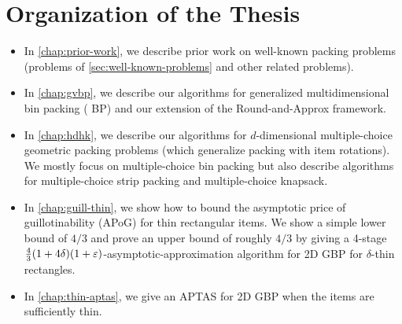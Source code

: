 \section{Organization of the Thesis}

\begin{itemize}
\item In \cref{chap:prior-work}, we describe prior work on well-known packing problems
    (problems of \cref{sec:well-known-problems} and other related problems).
\item In \cref{chap:gvbp}, we describe our algorithms for generalized multidimensional
    bin packing ( BP) and our extension of the Round-and-Approx framework.
\item In \cref{chap:hdhk}, we describe our algorithms for $d$-dimensional
    multiple-choice geometric packing problems (which generalize packing with item rotations).
    We mostly focus on multiple-choice bin packing but also describe algorithms for
    multiple-choice strip packing and multiple-choice knapsack.
\item In \cref{chap:guill-thin}, we show how to bound the asymptotic price of guillotinability
    (APoG) for thin rectangular items. We show a simple lower bound of $4/3$ and prove an
    upper bound of roughly $4/3$ by giving a 4-stage
    $\frac{4}{3}(1+4\delta)(1+\varepsilon)$-asymptotic-approximation algorithm for 2D GBP
    for $\delta$-thin rectangles.
\item In \cref{chap:thin-aptas}, we give an APTAS for 2D GBP when the items are
    sufficiently thin.
\end{itemize}
